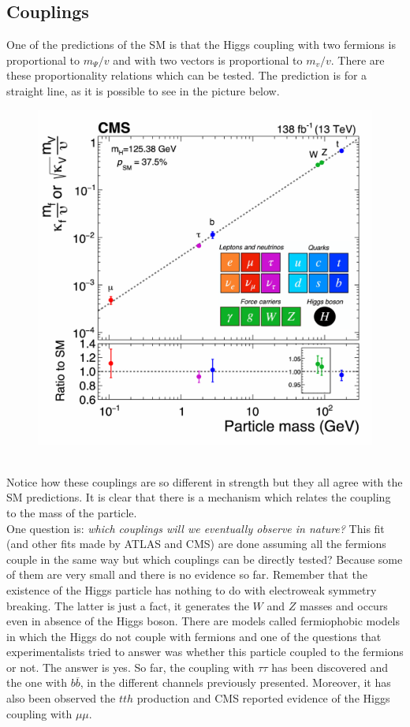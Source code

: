 \documentclass[../main.tex]{subfiles}
\begin{document}
\subsection{Couplings}
One of the predictions of the SM is that the Higgs coupling with two fermions is proportional to $m_\Psi/v$ and with two vectors is proportional to $m_v/v$. There are these proportionality relations which can be tested. The prediction is for a straight line, as it is possible to see in the picture below.
\begin{figure}[h]
    \centering
    \includegraphics{Images/higgscouplings.pdf}
    \caption*{}
\end{figure}\\
Notice how these couplings are so different in strength but they all agree with the SM predictions. It is clear that there is a mechanism which relates the coupling to the mass of the particle.\\
One question is: \textit{which couplings will we eventually observe in nature?} This fit (and other fits made by ATLAS and CMS) are done assuming all the fermions couple in the same way but which couplings can be directly tested? Because some of them are very small and there is no evidence so far. Remember that the existence of the Higgs particle has nothing to do with electroweak symmetry breaking. The latter is just a fact, it generates the $W$ and $Z$ masses and occurs even in absence of the Higgs boson.  There are models called fermiophobic models in which the Higgs do not couple with fermions and one of the questions that experimentalists tried to answer was whether this particle coupled to the fermions or not. The answer is yes. So far, the coupling with $\tau\tau$ has been discovered and the one with $b\overline{b}$, in the different channels previously presented. Moreover, it has also been observed the $tth$ production and CMS reported evidence of the Higgs coupling with $\mu\mu$. 
\end{document}
